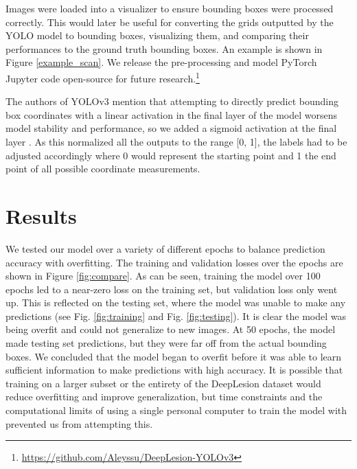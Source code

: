 Images were loaded into a visualizer to ensure bounding boxes were processed correctly. This would later be useful for converting the grids outputted by the YOLO model to bounding boxes, visualizing them, and comparing their performances to the ground truth bounding boxes. An example is shown in Figure \ref{example_scan}. We release the pre-processing and model PyTorch Jupyter code open-source for future research.\footnote{\url{https://github.com/Aleyssu/DeepLesion-YOLOv3}}

The authors of YOLOv3 mention that attempting to directly predict bounding box coordinates with a linear activation in the final layer of the model worsens model stability and performance, so we added a sigmoid activation at the final layer \cite{yolov3}. As this normalized all the outputs to the range [0, 1], the labels had to be adjusted accordingly where 0 would represent the starting point and 1 the end point of all possible coordinate measurements.


\section{Results}
We tested our model over a variety of different epochs to balance prediction accuracy with overfitting. The training and validation losses over the epochs are shown in Figure \ref{fig:compare}. As can be seen, training the model over 100 epochs led to a near-zero loss on the training set, but validation loss only went up. This is reflected on the testing set, where the model was unable to make any predictions (see Fig. \ref{fig:training} and Fig. \ref{fig:testing}). It is clear the model was being overfit and could not generalize to new images. At 50 epochs, the model made testing set predictions, but they were far off from the actual bounding boxes. We concluded that the model began to overfit before it was able to learn sufficient information to make predictions with high accuracy. It is possible that training on a larger subset or the entirety of the DeepLesion dataset would reduce overfitting and improve generalization, but time constraints and the computational limits of using a single personal computer to train the model with prevented us from attempting this.


        
